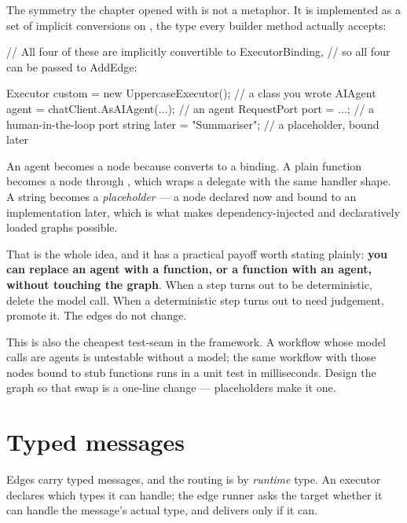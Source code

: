 The symmetry the chapter opened with is not a metaphor. It is implemented as a
set of implicit conversions on , the type every builder
method actually accepts:

\begin{csharp}[caption={What can be a node}, label={lst:wf-bindings}]
// All four of these are implicitly convertible to ExecutorBinding,
// so all four can be passed to AddEdge:

Executor  custom = new UppercaseExecutor();   // a class you wrote
AIAgent   agent  = chatClient.AsAIAgent(...); // an agent
RequestPort port = ...;                       // a human-in-the-loop port
string    later  = "Summariser";              // a placeholder, bound later
\end{csharp}

An agent becomes a node because  converts to a binding. A plain
function becomes a node through , which wraps a delegate
with the same handler shape. A string becomes a \emph{placeholder} --- a node
declared now and bound to an implementation later, which is what makes
dependency-injected and declaratively loaded graphs possible.

That is the whole idea, and it has a practical payoff worth stating plainly:
\textbf{you can replace an agent with a function, or a function with an agent,
without touching the graph}. When a step turns out to be deterministic, delete
the model call. When a deterministic step turns out to need judgement, promote it.
The edges do not change.

\begin{note}
This is also the cheapest test-seam in the framework. A workflow whose model
calls are agents is untestable without a model; the same workflow with those
nodes bound to stub functions runs in a unit test in milliseconds. Design the
graph so that swap is a one-line change --- placeholders make it one.
\end{note}

\section{Typed messages}
\label{sec:wf-messages}

Edges carry typed messages, and the routing is by \emph{runtime} type. An
executor declares which types it can handle; the edge runner asks the target
whether it can handle the message's actual type, and delivers only if it can.

